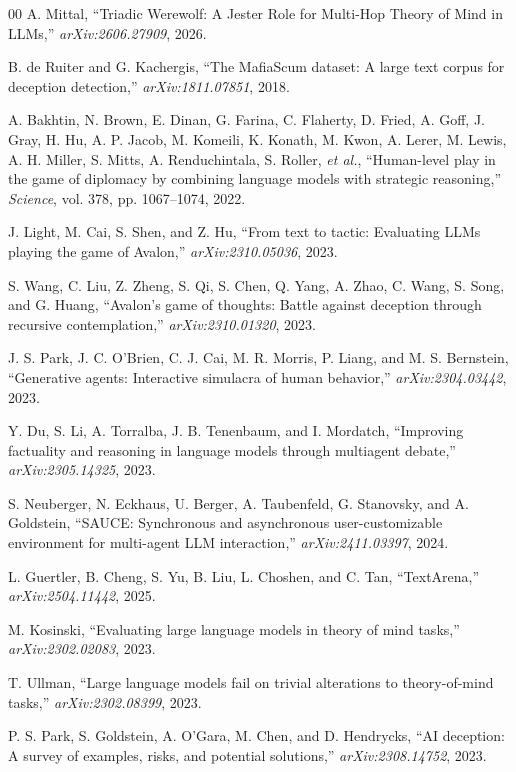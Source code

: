 \documentclass[10pt,conference]{IEEEtran}
\begin{document}
\begin{thebibliography}{00}
 A. Mittal, ``Triadic Werewolf: A Jester Role for Multi-Hop Theory of Mind in LLMs,'' \textit{arXiv:2606.27909}, 2026.

 B. de Ruiter and G. Kachergis, ``The MafiaScum dataset: A large text corpus for deception detection,'' \textit{arXiv:1811.07851}, 2018.

 A. Bakhtin, N. Brown, E. Dinan, G. Farina, C. Flaherty, D. Fried, A. Goff, J. Gray, H. Hu, A. P. Jacob, M. Komeili, K. Konath, M. Kwon, A. Lerer, M. Lewis, A. H. Miller, S. Mitts, A. Renduchintala, S. Roller, \textit{et al.}, ``Human-level play in the game of diplomacy by combining language models with strategic reasoning,'' \textit{Science}, vol. 378, pp. 1067--1074, 2022.

 J. Light, M. Cai, S. Shen, and Z. Hu, ``From text to tactic: Evaluating LLMs playing the game of Avalon,'' \textit{arXiv:2310.05036}, 2023.

 S. Wang, C. Liu, Z. Zheng, S. Qi, S. Chen, Q. Yang, A. Zhao, C. Wang, S. Song, and G. Huang, ``Avalon's game of thoughts: Battle against deception through recursive contemplation,'' \textit{arXiv:2310.01320}, 2023.

 J. S. Park, J. C. O'Brien, C. J. Cai, M. R. Morris, P. Liang, and M. S. Bernstein, ``Generative agents: Interactive simulacra of human behavior,'' \textit{arXiv:2304.03442}, 2023.

 Y. Du, S. Li, A. Torralba, J. B. Tenenbaum, and I. Mordatch, ``Improving factuality and reasoning in language models through multiagent debate,'' \textit{arXiv:2305.14325}, 2023.

 S. Neuberger, N. Eckhaus, U. Berger, A. Taubenfeld, G. Stanovsky, and A. Goldstein, ``SAUCE: Synchronous and asynchronous user-customizable environment for multi-agent LLM interaction,'' \textit{arXiv:2411.03397}, 2024.

 L. Guertler, B. Cheng, S. Yu, B. Liu, L. Choshen, and C. Tan, ``TextArena,'' \textit{arXiv:2504.11442}, 2025.

 M. Kosinski, ``Evaluating large language models in theory of mind tasks,'' \textit{arXiv:2302.02083}, 2023.

 T. Ullman, ``Large language models fail on trivial alterations to theory-of-mind tasks,'' \textit{arXiv:2302.08399}, 2023.

 P. S. Park, S. Goldstein, A. O'Gara, M. Chen, and D. Hendrycks, ``AI deception: A survey of examples, risks, and potential solutions,'' \textit{arXiv:2308.14752}, 2023.

\end{thebibliography}
\end{document}
